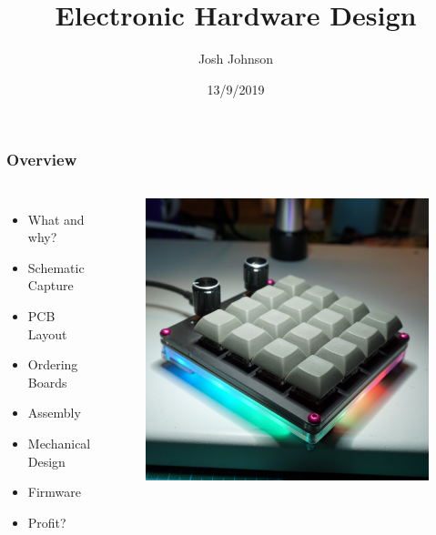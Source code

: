 \documentclass[t]{beamer}
\title[]{Electronic Hardware Design} %
\author{Josh Johnson} %
\institute[] %
{ CSides, September 2019\\ %
\medskip
\textit{} %
}
\date{13/9/2019} %
\begin{document}
\begin{frame}
\titlepage %
\end{frame}

\begin{frame}
\frametitle{Overview}
\vspace{-20pt}
\begin{columns}
	\begin{itemize}
		\item What and why?
		\item Schematic Capture
		\item PCB Layout
		\item Ordering Boards
		\item Assembly
		\item Mechanical Design
		\item Firmware
		\item Profit?
	\end{itemize}
	
	\begin{figure}
		\includegraphics[width=0.9\linewidth]{csidesKB.jpg}
	\end{figure}
	
\end{columns}
\end{frame}
\end{document}
